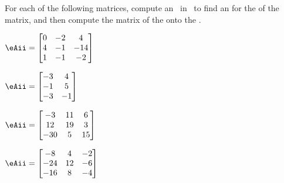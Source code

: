 \begin{exercise} \label{ex:orprmat} 
For each of the following matrices, compute an \svd\ in \script\ to find an  for the  of the matrix, and then compute the matrix of the  onto the .
\begin{Parts}
\item \(\eAii=\begin{bmatrix} 0&-2&4
\\4&-1&-14
\\1&-1&-2 \end{bmatrix}\)

\item \(\eAii=\begin{bmatrix} -3&4
\\-1&5
\\-3&-1 \end{bmatrix}\)

\begin{OmitV1}
\item \(\eAii=\begin{bmatrix} -3&11&6
\\12&19&3
\\-30&5&15 \end{bmatrix}\)

\item \(\eAii=\begin{bmatrix} -8&4&-2
\\-24&12&-6
\\-16&8&-4 \end{bmatrix}\)


\end{OmitV1}
\end{Parts}
\end{exercise}
